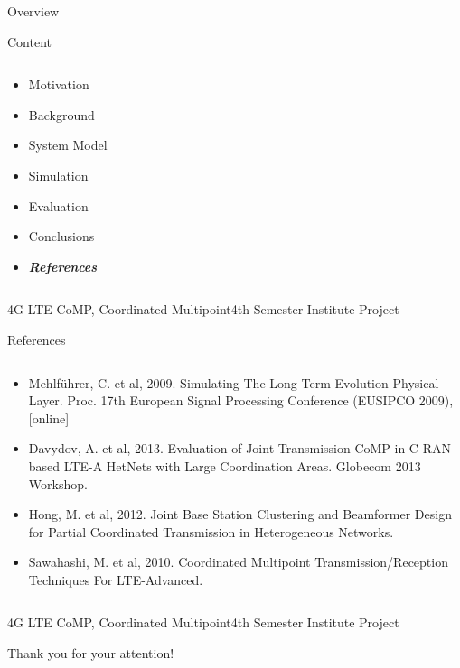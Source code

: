 \documentclass[xcolor={cmyk}]{beamer}
\begin{document}
\begin{frame}{Overview}
	\begin{block}{Content}
		\begin{columns}
			\begin{column}{.9\textwidth}
				\begin{itemize}
					\item Motivation
					\item Background
					\item System Model
					\item Simulation
					\item Evaluation
					\item Conclusions
					\item \textbf{\emph{References}}
				\end{itemize}
			\end{column}
		\end{columns}
	\end{block}
\end{frame}

 \begin{frame}{4G LTE CoMP, Coordinated Multipoint}{4th Semester Institute Project}
	 \begin{block}{References}
	 	\begin{columns}
			\begin{column}{.9\textwidth}
				\begin{itemize}
					\item Mehlführer, C. et al, 2009. Simulating The Long Term Evolution Physical Layer. Proc. 17th European Signal Processing Conference (EUSIPCO 2009), [online]
					\item Davydov, A. et al, 2013. Evaluation of Joint Transmission CoMP in C-RAN based LTE-A HetNets with Large Coordination Areas. Globecom 2013 Workshop.
					\item Hong, M. et al, 2012. Joint Base Station Clustering and Beamformer Design for Partial Coordinated Transmission in Heterogeneous Networks.
					\item Sawahashi, M. et al, 2010. Coordinated Multipoint Transmission/Reception Techniques For LTE-Advanced.
				\end{itemize}
			\end{column}
		\end{columns}
	 \end{block}
 \end{frame}
 
  \begin{frame}{4G LTE CoMP, Coordinated Multipoint}{4th Semester Institute Project}
	\begin{block}{Thank you for your attention!}
	\end{block}
 \end{frame}
\end{document}

